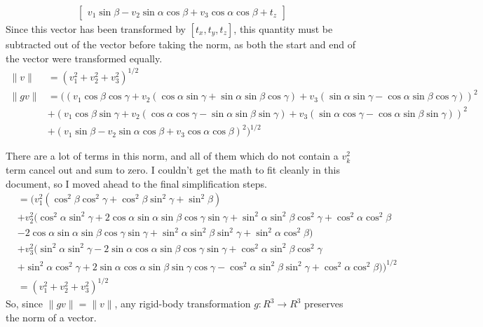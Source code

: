 \documentclass[12pt]{article}
\begin{document}
\begin{enumerate}
\begin{align*}
\begin{bmatrix}
	v_1\sin\beta - v_2\sin\alpha \cos\beta + v_3 \cos\alpha\cos\beta + t_z
	\end{bmatrix}
	\end{align*}
	Since this vector has been transformed by $[t_x, t_y, t_z]$, this quantity must be subtracted out of the vector before taking the norm, as both the start and end of the vector were transformed equally.
	\begin{align*}
	\| v \| &= (v_1^2 + v_2^2 + v_3^2)^{1/2} \\
	\| gv \| &= \big(\left(v_1\cos\beta\cos\gamma + v_2 (\cos\alpha \sin\gamma + \sin\alpha \sin\beta \cos\gamma)  + v_3 (\sin\alpha \sin\gamma - \cos\alpha \sin\beta \cos\gamma)\right)^2 \\ & + \left(v_1 \cos\beta \sin\gamma + v_2 (\cos\alpha \cos\gamma - \sin\alpha \sin\beta \sin\gamma) + v_3 ( \sin\alpha \cos\gamma - \cos\alpha \sin\beta \sin\gamma)\right)^2 \\ &+ \left(v_1\sin\beta - v_2\sin\alpha \cos\beta + v_3 \cos\alpha\cos\beta\right)^2\big)^{1/2}
	\end{align*}
	
	There are a lot of terms in this norm, and all of them which do not contain a $v_k^2$ term cancel out and sum to zero. I couldn't get the math to fit cleanly in this document, so I moved ahead to the final simplification steps.
	\begin{align*}
	&= \big(v_1^2(\cos^2\beta\cos^2\gamma + \cos^2\beta\sin^2\gamma + \sin^2\beta) \\
	&+ v_2^2 (\cos^2\alpha\sin^2\gamma + 2\cos\alpha\sin\alpha\sin\beta\cos\gamma\sin\gamma + \sin^2\alpha \sin^2\beta\cos^2\gamma + \cos^2\alpha\cos^2\beta \\
	&- 2\cos\alpha\sin\alpha\sin\beta\cos\gamma\sin\gamma + \sin^2\alpha\sin^2\beta\sin^2\gamma + \sin^2\alpha\cos^2\beta) \\
	&+ v_3^2 (\sin^2\alpha\sin^2\gamma - 2\sin\alpha\cos\alpha\sin\beta\cos\gamma\sin\gamma + \cos^2\alpha\sin^2\beta\cos^2\gamma \\ &+ \sin^2\alpha\cos^2\gamma + 2 \sin\alpha\cos\alpha\sin\beta\sin\gamma\cos\gamma - \cos^2\alpha\sin^2\beta\sin^2\gamma + \cos^2\alpha\cos^2\beta) \big)^{1/2} \\
	&= (v_1^2 + v_2^2 + v_3^2)^{1/2} 
	\end{align*}
	So, since $\|gv\| = \|v\|$, any rigid-body transformation $g: R^3 \rightarrow R^3$ preserves the norm of a vector.
	

\end{enumerate}
\end{document}
